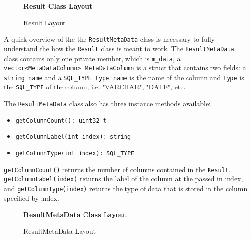 \documentclass[letterpaper, 12pt]{article}
\begin{document}
  \begin{figure}
    \centering
    \textbf{Result Class Layout}
    \caption{Result Layout}
  \end{figure}
  \par\vspace{\baselineskip}
  A quick overview of the the \lstinline|ResultMetaData| class 
  is necessary to fully understand the how the 
  \lstinline|Result| class is meant to work. 
  The \lstinline|ResultMetaData| class contains only one 
  private member, which is 
  \lstinline|m_data|, a 
  \lstinline|vector<MetaDataColumn>|. 
  \lstinline|MetaDataColumn| is a struct that contains two fields: 
  a \lstinline|string name| and a 
  \lstinline|SQL_TYPE type|. \lstinline|name|
  is the name of the column and \lstinline|type| is the 
  \lstinline|SQL_TYPE| of the column, i.e. "VARCHAR", "DATE", etc.
  \par\vspace{\baselineskip}
  The \lstinline|ResultMetaData| class also has 
  three instance methods available:
  \begin{itemize}
    \item \lstinline|getColumnCount(): uint32_t|
    \item \lstinline|getColumnLabel(int index): string|
    \item \lstinline|getColumnType(int index): SQL_TYPE|
  \end{itemize}

  \lstinline|getColumnCount()| returns the number of 
  columns contained in the \lstinline[basicstyle=\ttfamily]|Result|.
  \lstinline|getColumnLabel(index)| returns the label of the 
  column at the passed in index, and 
  \lstinline|getColumnType(index)| returns the type of data that
  is stored in the column specified by index.  
  
  \begin{figure}
    \centering
    \textbf{ResultMetaData Class Layout}
    \caption{ResultMetaData Layout}
  \end{figure}
  
  \newpage
\end{document}
